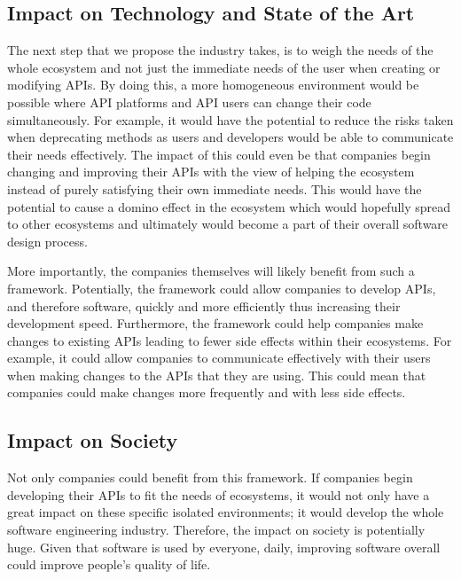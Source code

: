 \documentclass{article}
\begin{document}
\subsection{Impact on Technology and State of the Art}
The next step that we propose the industry takes, is to weigh the needs of the whole ecosystem and not just the immediate needs of the user when creating or modifying APIs. By doing this, a more homogeneous environment would be possible where API platforms and API users can change their code simultaneously. For example, it would have the potential to reduce the risks taken when deprecating methods as users and developers would be able to communicate their needs effectively. The impact of this could even be that companies begin changing and improving their APIs with the view of helping the ecosystem instead of purely satisfying their own immediate needs. This would have the potential to cause a domino effect in the ecosystem which would hopefully spread to other ecosystems and ultimately would become a part of their overall software design process. 

More importantly, the companies themselves will likely benefit from such a framework. Potentially, the framework could allow companies to develop APIs, and therefore software, quickly and more efficiently thus increasing their development speed. Furthermore, the framework could help companies make changes to existing APIs leading to fewer side effects within their ecosystems. For example, it could allow companies to communicate effectively with their users when making changes to the APIs that they are using. This could mean that companies could make changes more frequently and with less side effects.

\subsection{Impact on Society}
Not only companies could benefit from this framework. If companies begin developing their APIs to fit the needs of ecosystems, it would not only have a great impact on these specific isolated environments; it would develop the whole software engineering industry. Therefore, the impact on society is potentially huge. Given that software is used by everyone, daily, improving software overall could improve people's quality of life.
\end{document}
